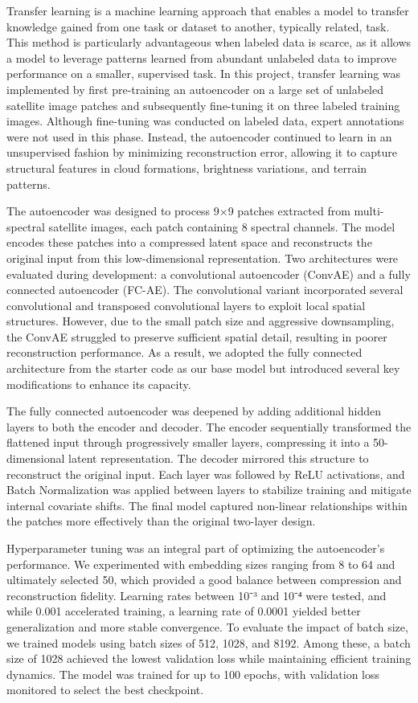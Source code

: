 \documentclass[11pt]{article}
\begin{document}
Transfer learning is a machine learning approach that enables a model to
transfer knowledge gained from one task or dataset to another, typically
related, task. This method is particularly advantageous when labeled
data is scarce, as it allows a model to leverage patterns learned from
abundant unlabeled data to improve performance on a smaller, supervised
task. In this project, transfer learning was implemented by first
pre-training an autoencoder on a large set of unlabeled satellite image
patches and subsequently fine-tuning it on three labeled training
images. Although fine-tuning was conducted on labeled data, expert
annotations were not used in this phase. Instead, the autoencoder
continued to learn in an unsupervised fashion by minimizing
reconstruction error, allowing it to capture structural features in
cloud formations, brightness variations, and terrain patterns.

The autoencoder was designed to process 9×9 patches extracted from
multi-spectral satellite images, each patch containing 8 spectral
channels. The model encodes these patches into a compressed latent space
and reconstructs the original input from this low-dimensional
representation. Two architectures were evaluated during development: a
convolutional autoencoder (ConvAE) and a fully connected autoencoder
(FC-AE). The convolutional variant incorporated several convolutional
and transposed convolutional layers to exploit local spatial structures.
However, due to the small patch size and aggressive downsampling, the
ConvAE struggled to preserve sufficient spatial detail, resulting in
poorer reconstruction performance. As a result, we adopted the fully
connected architecture from the starter code as our base model but
introduced several key modifications to enhance its capacity.

The fully connected autoencoder was deepened by adding additional hidden
layers to both the encoder and decoder. The encoder sequentially
transformed the flattened input through progressively smaller layers,
compressing it into a 50-dimensional latent representation. The decoder
mirrored this structure to reconstruct the original input. Each layer
was followed by ReLU activations, and Batch Normalization was applied
between layers to stabilize training and mitigate internal covariate
shifts. The final model captured non-linear relationships within the
patches more effectively than the original two-layer design.

    Hyperparameter tuning was an integral part of optimizing the
autoencoder's performance. We experimented with embedding sizes ranging
from 8 to 64 and ultimately selected 50, which provided a good balance
between compression and reconstruction fidelity. Learning rates between
10⁻³ and 10⁻⁴ were tested, and while 0.001 accelerated training, a
learning rate of 0.0001 yielded better generalization and more stable
convergence. To evaluate the impact of batch size, we trained models
using batch sizes of 512, 1028, and 8192. Among these, a batch size of
1028 achieved the lowest validation loss while maintaining efficient
training dynamics. The model was trained for up to 100 epochs, with
validation loss monitored to select the best checkpoint.
\end{document}
